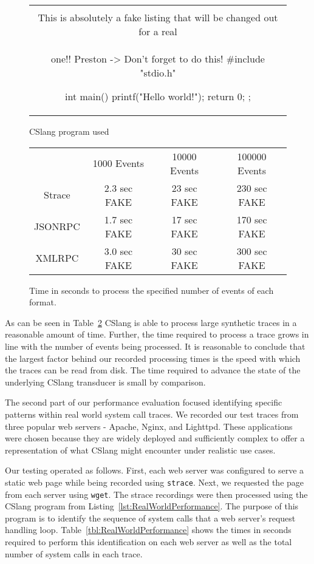 \begin{figure}[H]
\centering
\begin{tabular}{c}
\begin{lstlisting}
\\ This is absolutely a fake listing that will be changed out for a real
\\ one!!  Preston -> Don't forget to do this!
#include "stdio.h"

int main() {
    printf("Hello world!\n");
    return 0;
};
\end{lstlisting}
\end{tabular}
\caption{CSlang program used }
\label{lst:SyntheticPerformance}
\end{figure}


\begin{figure}
  \begin{tabular}{|c|c|c|c|}
                & 1000 Events   & 10000 Events & 100000 Events \\
  Strace        & 2.3 sec FAKE  & 23 sec FAKE  & 230 sec FAKE  \\
  JSONRPC       & 1.7 sec FAKE  & 17 sec FAKE  & 170 sec FAKE  \\
  XMLRPC        & 3.0 sec FAKE  & 30 sec FAKE  & 300 sec FAKE  \\
\end{tabular}
\caption{Time in seconds to process the specified number of events of each
  format.}
\label{tbl:SyntheticPerformance}
\end{figure}

As can be seen in Table~\ref{tbl:SyntheticPerformance} CSlang is able to
process large synthetic traces in a reasonable amount of time.  Further,
the time required to process a trace grows in line with the number of
events being processed.  It is reasonable to conclude that the largest
factor behind our recorded processing times is the speed with which the
traces can be read from disk.  The time required to advance the state of
the underlying CSlang transducer is small by comparison.

The second part of our performance evaluation focused identifying specific
patterns within real world system call traces.  We recorded our test traces
from three popular web servers - Apache, Nginx, and Lighttpd.  These
applications were chosen because they are widely deployed and sufficiently
complex to offer a representation of what CSlang might encounter under
realistic use cases.

Our testing operated as follows.  First, each web server was configured to
serve a static web page while being recorded using {\tt strace}.  Next, we
requested the page from each server using {\tt wget}.  The strace
recordings were then processed using the CSlang program from
Listing~\ref{lst:RealWorldPerformance}.  The purpose of this program is to
identify the sequence of system calls that a web server's request handling
loop.  Table~\ref{tbl:RealWorldPerformance}
shows the times in seconds required to perform this identification on each
web server as well as the total number of system calls in each trace.

